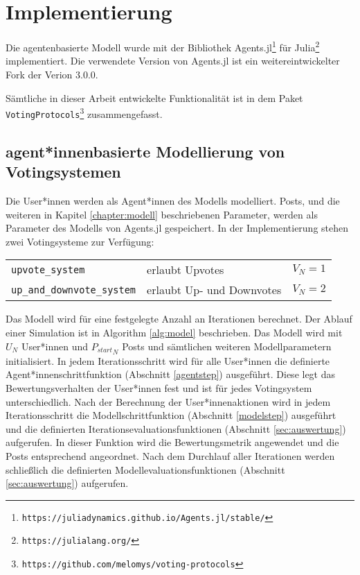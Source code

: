 \chapter{Implementierung}

Die agentenbasierte Modell wurde mit der Bibliothek Agents.jl\footnote{\texttt{https://juliadynamics.github.io/Agents.jl/stable/}} für Julia\footnote{\texttt{https://julialang.org/}} implementiert. Die verwendete Version von Agents.jl ist ein weitereintwickelter Fork der Verion 3.0.0.
	
Sämtliche in dieser Arbeit entwickelte Funktionalität ist in dem Paket \texttt{VotingProtocols}\footnote{\texttt{https://github.com/melomys/voting-protocols}} zusammengefasst.


\section{agent*innenbasierte Modellierung von Votingsystemen}

Die User*innen werden als Agent*innen des Modells modelliert. Posts, und die weiteren in Kapitel \ref{chapter:modell} beschriebenen Parameter, werden als Parameter des Modells von Agents.jl gespeichert. In der Implementierung stehen zwei Votingsysteme zur Verfügung:

\begin{table}[!htbp]
	\begin{tabularx}{\textwidth}{llX}
		\texttt{upvote\_system}& erlaubt Upvotes & $V_N = 1$\\
		\texttt{up\_and\_downvote\_system} & erlaubt Up- und Downvotes & $V_N =2$ \\
	\end{tabularx}
\end{table}

Das Modell wird für eine festgelegte Anzahl an Iterationen berechnet. Der Ablauf einer Simulation ist in Algorithm \ref{alg:model} beschrieben. Das Modell wird mit $U_N$ User*innen und ${P_{start}}_{N}$ Posts und sämtlichen weiteren Modellparametern initialisiert. In jedem Iterationsschritt wird für alle User*innen die definierte Agent*innenschrittfunktion (Abschnitt \ref{agentstep}) ausgeführt. Diese legt das Bewertungsverhalten der User*innen fest und ist für jedes Votingsystem unterschiedlich. Nach der Berechnung der User*innenaktionen wird in jedem Iterationsschritt die Modellschrittfunktion (Abschnitt \ref{modelstep}) ausgeführt und die definierten Iterationsevaluationsfunktionen (Abschnitt \ref{sec:auswertung}) aufgerufen. In dieser Funktion wird die Bewertungsmetrik angewendet und die Posts entsprechend angeordnet. Nach dem Durchlauf aller Iterationen werden schließlich die definierten Modellevaluationsfunktionen (Abschnitt \ref{sec:auswertung}) aufgerufen.

